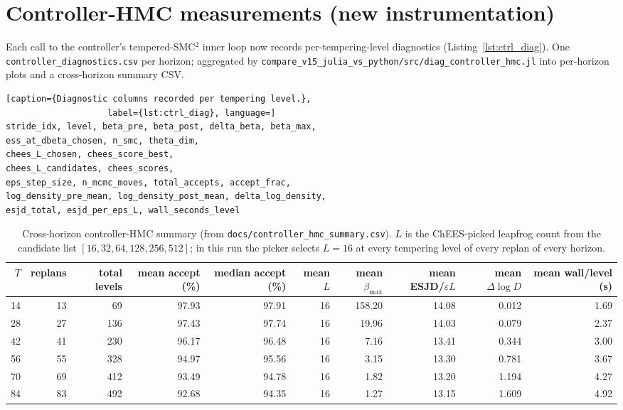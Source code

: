 \documentclass[11pt,a4paper]{article}
\begin{document}
\section{Controller-HMC measurements (new instrumentation)}
\label{sec:ctrl_hmc}

Each call to the controller's tempered-SMC$^2$ inner loop now records
per-tempering-level diagnostics (Listing~\ref{lst:ctrl_diag}). One
\texttt{controller\_diagnostics.csv} per horizon; aggregated by
\texttt{compare\_v15\_julia\_vs\_python/src/diag\_controller\_hmc.jl}
into per-horizon plots and a cross-horizon summary CSV.

\begin{lstlisting}[caption={Diagnostic columns recorded per tempering level.},
                    label={lst:ctrl_diag}, language=]
stride_idx, level, beta_pre, beta_post, delta_beta, beta_max,
ess_at_dbeta_chosen, n_smc, theta_dim,
chees_L_chosen, chees_score_best,
chees_L_candidates, chees_scores,
eps_step_size, n_mcmc_moves, total_accepts, accept_frac,
log_density_pre_mean, log_density_post_mean, delta_log_density,
esjd_total, esjd_per_eps_L, wall_seconds_level
\end{lstlisting}

\begin{table}[ht]
\centering
\footnotesize
\begin{tabular}{rrrrrrrrrr}
\toprule
$T$ & replans & total levels & mean accept (\%) & median accept (\%) & mean $L$ & mean $\beta_{\max}$ & mean ESJD/$\varepsilon L$ & mean $\Delta\log D$ & mean wall/level (s) \\
\midrule
14 & 13 & 69  & 97.93 & 97.91 & 16 & 158.20 & 14.08 & 0.012 & 1.69 \\
28 & 27 & 136 & 97.43 & 97.74 & 16 &  19.96 & 14.03 & 0.079 & 2.37 \\
42 & 41 & 230 & 96.17 & 96.48 & 16 &   7.16 & 13.41 & 0.344 & 3.00 \\
56 & 55 & 328 & 94.97 & 95.56 & 16 &   3.15 & 13.30 & 0.781 & 3.67 \\
70 & 69 & 412 & 93.49 & 94.78 & 16 &   1.82 & 13.20 & 1.194 & 4.27 \\
84 & 83 & 492 & 92.68 & 94.35 & 16 &   1.27 & 13.15 & 1.609 & 4.92 \\
\bottomrule
\end{tabular}
\caption{Cross-horizon controller-HMC summary (from
\texttt{docs/controller\_hmc\_summary.csv}). $L$ is the
ChEES-picked leapfrog count from the candidate list
$[16, 32, 64, 128, 256, 512]$; in this run the picker selects $L=16$
at every tempering level of every replan of every horizon.}
\label{tab:ctrl_hmc}
\end{table}
\end{document}
